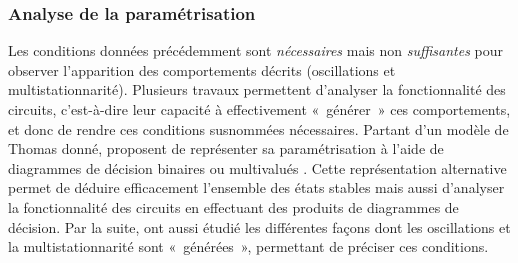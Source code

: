 \subsubsection*{Analyse de la paramétrisation}
Les conditions données précédemment sont \emph{nécessaires} mais non \emph{suffisantes}
pour observer l'apparition des comportements décrits (oscillations et multistationnarité).
Plusieurs travaux permettent d'analyser la fonctionnalité des circuits,
c'est-à-dire leur capacité à effectivement «~générer~» ces comportements,
et donc de rendre ces conditions susnommées nécessaires.
Partant d'un modèle de Thomas donné,
 proposent de représenter sa paramétrisation
à l'aide de diagrammes de décision binaires ou multivalués \cite{Bryant86,Srinivasan90}.
Cette représentation alternative permet de déduire efficacement
l'ensemble des états stables mais aussi d'analyser la fonctionnalité des circuits
en effectuant des produits de diagrammes de décision.
Par la suite, \cite{Comet13} ont aussi étudié les différentes façons
dont les oscillations et la multistationnarité sont «~générées~»,
permettant de préciser ces conditions.


% 
% 

